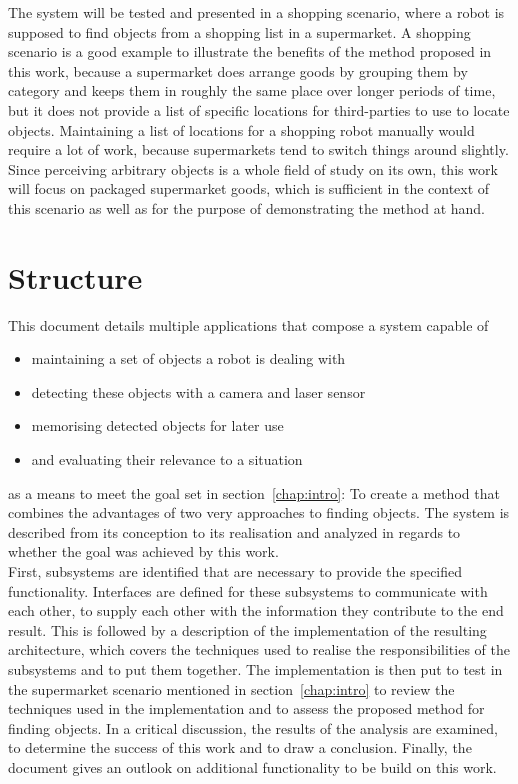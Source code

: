 The system will be tested and presented in a shopping scenario, where a robot is supposed to find objects from a shopping list in a supermarket. A shopping scenario is a good example to illustrate the benefits of the method proposed in this work, because a supermarket does arrange goods by grouping them by category and keeps them in roughly the same place over longer periods of time, but it does not provide a list of specific locations for third-parties to use to locate objects. Maintaining a list of locations for a shopping robot manually would require a lot of work, because supermarkets tend to switch things around slightly. \\

Since perceiving arbitrary objects is a whole field of study on its own, this work will focus on packaged supermarket goods, which is sufficient in the context of this scenario as well as for the purpose of demonstrating the method at hand.

\section{Structure}
This document details multiple applications that compose a system capable of
\begin{itemize}
  \itemsep 0em
  \item maintaining a set of objects a robot is dealing with
  \item detecting these objects with a camera and laser sensor
  \item memorising detected objects for later use
  \item and evaluating their relevance to a situation
\end{itemize}
as a means to meet the goal set in section~\ref{chap:intro}: To create a method that combines the advantages of two very approaches to finding objects. The system is described from its conception to its realisation and analyzed in regards to whether the goal was achieved by this work. \\

First, subsystems are identified that are necessary to provide the specified functionality. Interfaces are defined for these subsystems to communicate with each other, to supply each other with the information they contribute to the end result. This is followed by a description of the implementation of the resulting architecture, which covers the techniques used to realise the responsibilities of the subsystems and to put them together. The implementation is then put to test in the supermarket scenario mentioned in section~\ref{chap:intro} to review the techniques used in the implementation and to assess the proposed method for finding objects. In a critical discussion, the results of the analysis are examined, to determine the success of this work and to draw a conclusion. Finally, the document gives an outlook on additional functionality to be build on this work.
